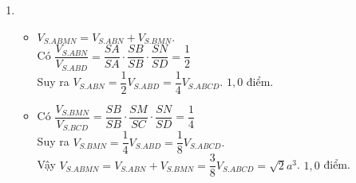 \begin{bt}
{\begin{enumerate}
\begin{itemize}
	Có $d(N,(BCM))=\dfrac{1}{2}d(D,(SBC))$ và $S_{BCM}=\dfrac{1}{2}S_{SBC}$.\\
	Suy ra $V_{BCMN}=\dfrac{1}{4}V_{D.SBC}$ \dotfill $1{,}0$ điểm.
	\item Có $V_{D.SBC}=V_{S.BCD}=\dfrac{1}{2}V_{S.ABCD}$.\\
	Vậy  $V_{BCMN}=\dfrac{1}{8}V_{S.ABCD}=\dfrac{\sqrt{2}a^3}{3}$ .\dotfill $1{,}0$ điểm.
	\end{itemize}
    \item 
	\begin{itemize}
	\item $V_{S.ABMN}=V_{S.ABN}+V_{S.BMN}$.\\
	Có $\dfrac{V_{S.ABN}}{V_{S.ABD}}=\dfrac{SA}{SA}\cdot \dfrac{SB}{SB}\cdot \dfrac{SN}{SD}=\dfrac{1}{2}$\\
	Suy ra $V_{S.ABN}=\dfrac{1}{2}V_{S.ABD}=\dfrac{1}{4}V_{S.ABCD}.$ \dotfill $1{,}0$ điểm.
	\item Có $\dfrac{V_{S.BMN}}{V_{S.BCD}}=\dfrac{SB}{SB}\cdot \dfrac{SM}{SC}\cdot \dfrac{SN}{SD}=\dfrac{1}{4}$\\
	Suy ra $V_{S.BMN}=\dfrac{1}{4}V_{S.ABD}=\dfrac{1}{8}V_{S.ABCD}.$\\
	Vậy $V_{S.ABMN}=V_{S.ABN}+V_{S.BMN}=\dfrac{3}{8}V_{S.ABCD}=\sqrt{2}a^3$. \dotfill $1{,}0$ điểm.
	\end{itemize}
\end{enumerate}
	}
\end{bt}
